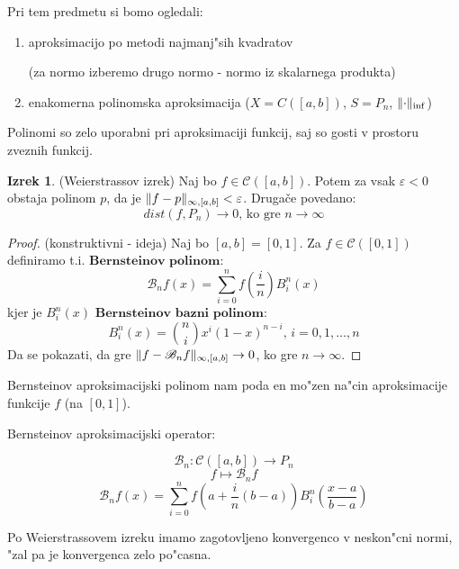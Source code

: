 \documentclass[a4paper,12pt]{article}
\DeclarePairedDelimiter\norm{\lVert}{\rVert}
\theoremstyle{definition}
\newtheorem{theorem}[counter]{Izrek}
\theoremstyle{remark}
\begin{document}
Pri tem predmetu si bomo ogledali:
\begin{enumerate}
    \item aproksimacijo po metodi najmanj"sih kvadratov
    
    (za normo izberemo drugo normo - normo iz skalarnega produkta)
    \item enakomerna polinomska aproksimacija ($X = C([a, b])$, $S = P_n$, $\norm{\cdot}_{\inf}$)
\end{enumerate}

Polinomi so zelo uporabni pri aproksimaciji funkcij, saj so gosti v prostoru zveznih funkcij.

\begin{theorem} (Weierstrassov izrek)
    Naj bo $f \in \mathscr{C} ([a, b])$. Potem za vsak $\varepsilon < 0$ obstaja polinom $p$, da je $\norm{f - p}_{\infty, [a, b]} < \varepsilon$. Drugače povedano:
    \begin{equation}
        dist(f, P_n) \to 0 \text{, ko gre } n \to \infty
    \end{equation}
\end{theorem}

\begin{proof}(konstruktivni - ideja)
    Naj bo $[a, b] = [0, 1]$. Za $f \in \mathscr{C} ([0, 1])$ definiramo t.i. $\textbf{Bernsteinov polinom}$:
    \begin{equation}
        \mathscr{B}_n f (x) = \sum_{i = 0}^{n} f (\frac{i}{n}) B_i^n(x)
    \end{equation}
    kjer je $B_i^n(x)$ $\textbf{Bernsteinov bazni polinom}$:
    \begin{equation}
        B_i^n (x) = {n \choose i} x^i (1-x)^{n-i} \text{, } i = 0, 1, \dots, n  
    \end{equation}
    Da se pokazati, da gre $\norm{f - \mathscr{B}_n f}_{\infty, [a, b]} \to 0$, ko gre $n \to \infty$.
\end{proof}

Bernsteinov aproksimacijski polinom nam poda en mo"zen na"cin aproksimacije funkcije $f$ (na $[0, 1]$).

Bernsteinov aproksimacijski operator:

\[\mathscr{B}_n : \mathscr{C} ([a, b]) \to P_n\]
\[f \mapsto \mathscr{B}_n f\]
\begin{equation}
    \mathscr{B}_n f(x) = \sum_{i = 0}^{n} f(a + \frac{i}{n}(b-a)) B_i^n (\frac{x-a}{b-a})
\end{equation}

Po Weierstrassovem izreku imamo zagotovljeno konvergenco v neskon"cni normi, "zal pa je konvergenca zelo po"casna.
\end{document}
